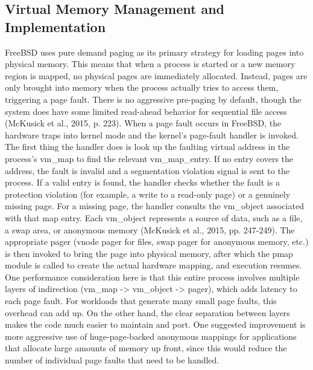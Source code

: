 \subsection{Virtual Memory Management and Implementation}
FreeBSD uses pure demand paging as its primary strategy for loading pages into physical memory. This means that when a process is started or a new memory region is mapped, no physical pages are immediately allocated. Instead, pages are only brought into memory when the process actually tries to access them, triggering a page fault. There is no aggressive pre-paging by default, though the system does have some limited read-ahead behavior for sequential file access (McKusick et al., 2015, p. 223).
When a page fault occurs in FreeBSD, the hardware traps into kernel mode and the kernel's page-fault handler is invoked. The first thing the handler does is look up the faulting virtual address in the process's vm\_map to find the relevant vm\_map\_entry. If no entry covers the address, the fault is invalid and a segmentation violation signal is sent to the process. If a valid entry is found, the handler checks whether the fault is a protection violation (for example, a write to a read-only page) or a genuinely missing page. For a missing page, the handler consults the vm\_object associated with that map entry. Each vm\_object represents a source of data, such as a file, a swap area, or anonymous memory (McKusick et al., 2015, pp. 247-249). The appropriate pager (vnode pager for files, swap pager for anonymous memory, etc.) is then invoked to bring the page into physical memory, after which the pmap module is called to create the actual hardware mapping, and execution resumes.
One performance consideration here is that this entire process involves multiple layers of indirection (vm\_map -> vm\_object -> pager), which adds latency to each page fault. For workloads that generate many small page faults, this overhead can add up. On the other hand, the clear separation between layers makes the code much easier to maintain and port. One suggested improvement is more aggressive use of huge-page-backed anonymous mappings for applications that allocate large amounts of memory up front, since this would reduce the number of individual page faults that need to be handled.

